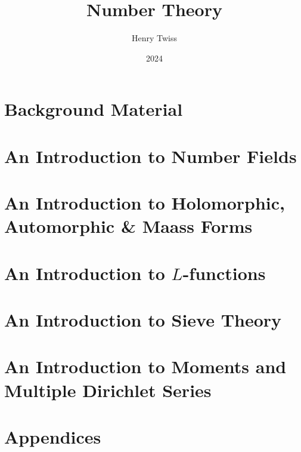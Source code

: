 \documentclass[12pt,oneside]{book}
\title{Number Theory}
\author{Henry Twiss}
\date{2024}
\begin{document}
\maketitle
\pagestyle{empty}
\tableofcontents
\setcounter{page}{0}
\pagestyle{fancy}

\part{Background Material}
  

\part{An Introduction to Number Fields}
  

\part{An Introduction to Holomorphic, Automorphic \& Maass Forms}
  
  
  
  

\part{An Introduction to \texorpdfstring{$L$}{L}-functions}
  
  
  

\part{An Introduction to Sieve Theory}
  
  

\part{An Introduction to Moments and Multiple Dirichlet Series}
  
  

\part{Appendices}
  

\printindex


\end{document}
